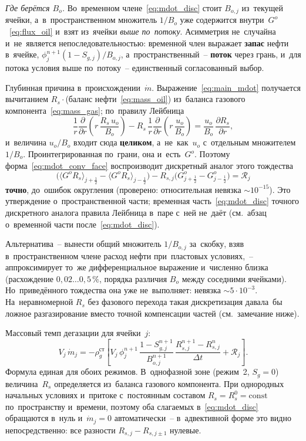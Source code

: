 \documentclass[12pt,a4paper]{article}
\newcommand{\half}{\tfrac{1}{2}}
\newcommand{\divr}[1]{\frac{1}{r}\frac{\partial}{\partial r}\!\left(r\,#1\right)}
\newcommand{\pdr}[1]{\frac{\partial #1}{\partial r}}
\newcommand{\mdot}{\dot{m}}
\begin{document}
\emph{Где берётся $B_o$.} Во~временном члене~\eqref{eq:mdot_disc}
стоит $B_{o,j}$ из~текущей ячейки, а~в~пространственном множитель
$1/B_o$ уже содержится внутри~$G^o$~\eqref{eq:flux_oil} и~взят
из~ячейки \emph{выше по~потоку}. Асимметрия не~случайна и~не~является
непоследовательностью: временной член выражает \textbf{запас} нефти
в~ячейке, $\phi_j^{n+1}(1-S_{g,j})/B_{o,j}$, а~пространственный~--
\textbf{поток} через грань, и~для потока условия выше по~потоку~--
единственный согласованный выбор.

Глубинная причина в~происхождении~$\mdot$. Выражение~\eqref{eq:main_mdot}
получается вычитанием $R_s\cdot$(баланс нефти~\eqref{eq:mass_oil})
из~баланса газового компонента~\eqref{eq:mass_gas}; по~правилу Лейбница
\[
  \divr{\frac{R_s\,u_o}{B_o}}
  - R_s\,\divr{\frac{u_o}{B_o}}
  = \frac{u_o}{B_o}\,\pdr{R_s},
\]
и~величина $u_o/B_o$ входит сюда \textbf{целиком}, а~не~как~$u_o$
с~отдельным множителем~$1/B_o$. Проинтегрированная по~грани, она
и~есть~$G^o$. Поэтому форма~\eqref{eq:mdot_conv_face} воспроизводит
дискретный аналог этого тождества
\[
  \bigl(\langle G^o R_s\rangle_{j+\half}
      - \langle G^o R_s\rangle_{j-\half}\bigr)
  - R_{s,j}\bigl(G^o_{j+\half} - G^o_{j-\half}\bigr)
  = \mathcal{R}_j
\]
\textbf{точно}, до~ошибок округления (проверено: относительная невязка
$\sim 10^{-15}$). Это утверждение о~пространственной части; временная
часть~\eqref{eq:mdot_disc} точного дискретного аналога правила
Лейбница в~паре с~ней не~даёт (см.~абзац о~временной части
после~\eqref{eq:mdot_disc}).

Альтернатива~-- вынести общий множитель $1/B_{o,j}$ за~скобку,
взяв в~пространственном члене расход нефти при~пластовых
условиях,~-- аппроксимирует то~же дифференциальное выражение
и~численно близка (расхождение $0{,}02\ldots0{,}5\,\%$, порядка
различия $B_o$ между соседними ячейками). Но~приведённого тождества
она уже не~выполняет: невязка $\sim 5\cdot10^{-3}$. На~неравномерной
$R_s$ без фазового перехода такая дискретизация давала~бы ложное
разгазирование вместо точной компенсации частей (см.~замечание ниже).

Массовый темп дегазации для ячейки~$j$:
\begin{equation}\label{eq:mdot_disc}
  V_j\,\mdot_j = -\rho_g^{\text{ст}}\!\left[
    V_j\,\phi_j^{n+1}\,\frac{1-S_{g,j}^{n+1}}{B_{o,j}^{n+1}}\,
      \frac{R_{s,j}^{n+1} - R_{s,j}^n}{\Delta t}
    + \mathcal{R}_j
  \right].
\end{equation}
Формула единая для обоих режимов. В~однофазной зоне
(режим~2, $S_g = 0$) величина~$R_s$ определяется из~баланса
газового компонента. При однородных начальных условиях
и~притоке с~постоянным составом $R_s = R_s^0 = \mathrm{const}$
по~пространству и~времени, поэтому оба слагаемых
в~\eqref{eq:mdot_disc} обращаются в~нуль
и~$\mdot_j = 0$ автоматически~-- в~адвективной форме это видно
непосредственно: все разности $R_{s,j} - R_{s,j\pm 1}$ нулевые.
\end{document}
